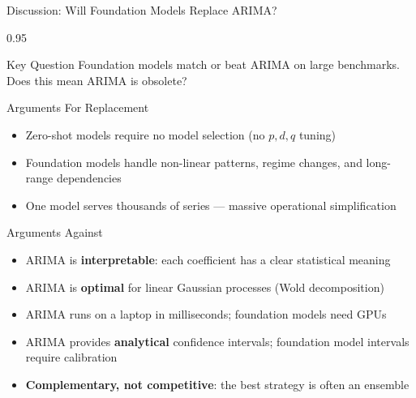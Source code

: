 \documentclass[9pt, aspectratio=169, t]{beamer}
\begin{document}
\begin{frame}{Discussion: Will Foundation Models Replace ARIMA?}
    \begin{cminipage}{0.95\textwidth}
    {\small
    \begin{alertblock}{Key Question}
        Foundation models match or beat ARIMA on large benchmarks. Does this mean ARIMA is obsolete?
    \end{alertblock}
    \begin{block}{Arguments For Replacement}
        \begin{itemize}\setlength{\itemsep}{0pt}
            \item Zero-shot models require no model selection (no $p,d,q$ tuning)
            \item Foundation models handle non-linear patterns, regime changes, and long-range dependencies
            \item One model serves thousands of series --- massive operational simplification
        \end{itemize}
    \end{block}
    \begin{exampleblock}{Arguments Against}
        \begin{itemize}\setlength{\itemsep}{0pt}
            \item ARIMA is \textbf{interpretable}: each coefficient has a clear statistical meaning
            \item ARIMA is \textbf{optimal} for linear Gaussian processes (Wold decomposition)
            \item ARIMA runs on a laptop in milliseconds; foundation models need GPUs
            \item ARIMA provides \textbf{analytical} confidence intervals; foundation model intervals require calibration
            \item \textbf{Complementary, not competitive}: the best strategy is often an ensemble
        \end{itemize}
    \end{exampleblock}
    }
    \end{cminipage}
\end{frame}
\end{document}

